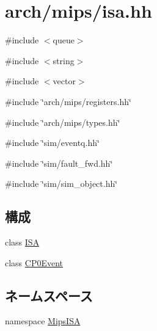 \hypertarget{mips_2isa_8hh}{
\section{arch/mips/isa.hh}
\label{mips_2isa_8hh}
}
{\ttfamily \#include $<$queue$>$}\par
{\ttfamily \#include $<$string$>$}\par
{\ttfamily \#include $<$vector$>$}\par
{\ttfamily \#include \char`\"{}arch/mips/registers.hh\char`\"{}}\par
{\ttfamily \#include \char`\"{}arch/mips/types.hh\char`\"{}}\par
{\ttfamily \#include \char`\"{}sim/eventq.hh\char`\"{}}\par
{\ttfamily \#include \char`\"{}sim/fault\_\-fwd.hh\char`\"{}}\par
{\ttfamily \#include \char`\"{}sim/sim\_\-object.hh\char`\"{}}\par
\subsection*{構成}
\begin{DoxyCompactItemize}
\item 
class \hyperlink{classMipsISA_1_1ISA}{ISA}
\item 
class \hyperlink{classMipsISA_1_1ISA_1_1CP0Event}{CP0Event}
\end{DoxyCompactItemize}
\subsection*{ネームスペース}
\begin{DoxyCompactItemize}
\item 
namespace \hyperlink{namespaceMipsISA}{MipsISA}
\end{DoxyCompactItemize}
